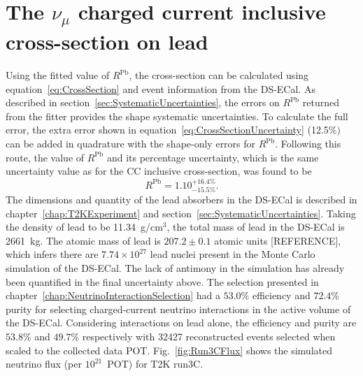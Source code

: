 \section{The $\nu_\mu$ charged current inclusive cross-section on lead}
\label{sec:PbCrossSection}
Using the fitted value of $R^{\textrm{Pb}}$, the cross-section can be calculated using equation~\ref{eq:CrossSection} and event information from the DS-ECal.  As described in section~\ref{sec:SystematicUncertainties}, the errors on $R^{\textrm{Pb}}$ returned from the fitter provides the shape systematic uncertainties.  To calculate the full error, the extra error shown in equation~\ref{eq:CrossSectionUncertainty} (12.5$\%)$ can be added in quadrature with the shape-only errors for $R^{\textrm{Pb}}$.  Following this route, the value of $R^{\textrm{Pb}}$ and its percentage uncertainty, which is the same uncertainty value as for the CC inclusive cross-section, was found to be
\begin{equation}
R^{\textrm{Pb}} = 1.10^{+16.4\%}_{-15.5\%}.
\label{eq:RPbWithFullPercentageError}
\end{equation}
The dimensions and quantity of the lead absorbers in the DS-ECal is described in chapter~\ref{chap:T2KExperiment} and section~\ref{sec:SystematicUncertainties}.  Taking the density of lead to be 11.34~g/cm$^{3}$, the total mass of lead in the DS-ECal is 2661~kg.  The atomic mass of lead is $207.2\pm0.1$ atomic units [REFERENCE], which infers there are $7.74\times10^{27}$ lead nuclei present in the Monte Carlo simulation of the DS-ECal.  The lack of antimony in the simulation has already been quantified in the final uncertainty above.
\newline
\newline
The selection presented in chapter~\ref{chap:NeutrinoInteractionSelection} had a $53.0\%$ efficiency and $72.4\%$ purity for selecting charged-current neutrino interactions in the active volume of the DS-ECal.  Considering interactions on lead alone, the efficiency and purity are $53.8\%$ and $49.7\%$ respectively with 32427 reconstructed events selected when scaled to the collected data POT.
\newline
\newline
Fig.~\ref{fig:Run3CFlux} shows the simulated neutrino flux (per $10^{21}$~POT) for T2K run3C.  

